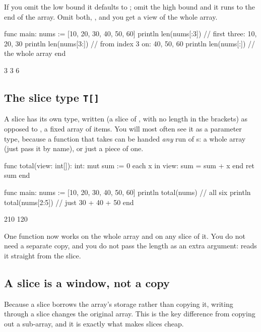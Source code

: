 If you omit the low bound it defaults to ; omit the high bound and it runs
to the end of the array. Omit both, , and you get a view of the whole
array.

\begin{salamen}
func main:
    nums := [10, 20, 30, 40, 50, 60]
    println len(nums[:3])     // first three: 10, 20, 30
    println len(nums[3:])     // from index 3 on: 40, 50, 60
    println len(nums[:])      // the whole array
end
\end{salamen}

\begin{progout}
3
3
6
\end{progout}

\subsection{The slice type \texttt{T[]}}

A slice has its own type, written  (a slice of , with no length
in the brackets) as opposed to , a fixed array of  items. You
will most often see it as a parameter type, because a function that takes
 can be handed \emph{any} run of s: a whole array (just
pass it by name), or just a piece of one.

\begin{salamen}
func total(view: int[]): int:
    mut sum := 0
    each x in view:
        sum = sum + x
    end
    ret sum
end

func main:
    nums := [10, 20, 30, 40, 50, 60]
    println total(nums)         // all six
    println total(nums[2:5])    // just 30 + 40 + 50
end
\end{salamen}

\begin{progout}
210
120
\end{progout}

One  function now works on the whole array and on any slice of it. You
do not need a separate copy, and you do not pass the length as an extra argument:
 reads it straight from the slice.

\subsection{A slice is a window, not a copy}

Because a slice borrows the array's storage rather than copying it, writing
through a slice changes the original array. This is the key difference from
copying out a sub-array, and it is exactly what makes slices cheap.

